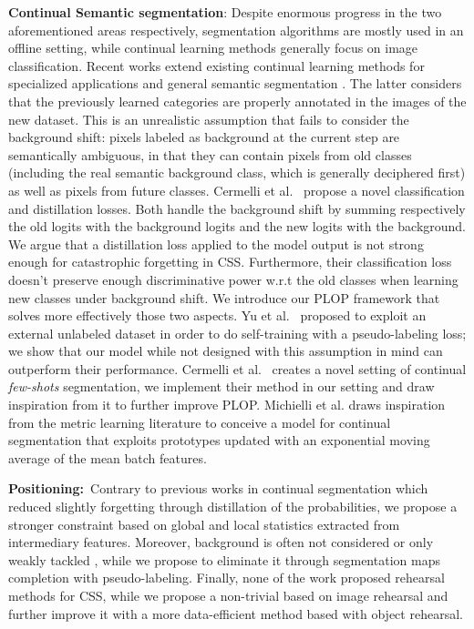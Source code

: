 \noindent\textbf{Continual Semantic segmentation}: Despite enormous progress in the two
aforementioned areas respectively, segmentation algorithms are mostly used in an offline setting,
while continual learning methods generally focus on image classification. Recent works extend
existing continual learning methods \cite{li2018lwf,hou2019ucir} for specialized applications
\cite{ozdemir2018learnthenewkeeptheold,ozdemir2019segmentationanotomical,tasar19incrementsegmentationremotesensing}
and general semantic segmentation \cite{michieli2019ilt}. The latter considers that the previously
learned categories are properly annotated in the images of the new dataset. This is an unrealistic
assumption that fails to consider the background shift: pixels labeled as background at the current
step are semantically ambiguous, in that they can contain pixels from old classes (including the
real semantic background class, which is generally deciphered first) as well as pixels from future
classes. Cermelli et al.~\cite{cermelli2020modelingthebackground} propose a novel classification and
distillation losses. Both handle the background shift by summing respectively the old logits with
the background logits and the new logits with the background. We argue that a distillation loss
applied to the model output is not strong enough for catastrophic forgetting in \ac{CSS}. Furthermore,
their classification loss doesn't preserve enough discriminative power w.r.t the old classes when
learning new classes under background shift. We introduce our PLOP framework that solves more
effectively those two aspects. Yu et al.~\cite{yu2020continualsegmentationselftraining} proposed to
exploit an external unlabeled dataset in order to do self-training with a pseudo-labeling loss; we
show that our model while not designed with this assumption in mind can outperform their
performance. Cermelli et al.~\cite{cermelli2020fewshotcontinualsegm} creates a novel setting of
continual \textit{few-shots} segmentation, we implement their method in our setting and draw
inspiration from it to further improve PLOP. Michielli et al.\cite{michieli2021sdr} draws
inspiration from the metric learning literature to conceive a model for continual segmentation that
exploits prototypes updated with an exponential moving average of the mean batch features.

\noindent\textbf{Positioning:\,} Contrary to previous works in continual segmentation
\cite{michieli2019ilt,cermelli2020modelingthebackground} which reduced slightly forgetting through
distillation of the probabilities, we propose a stronger constraint based on global and local
statistics extracted from intermediary features. Moreover, background is often not considered
\cite{michieli2019ilt} or only weakly tackled \cite{cermelli2020modelingthebackground}, while we
propose to eliminate it through segmentation maps completion with pseudo-labeling. Finally, none of
the work proposed rehearsal methods for \ac{CSS}, while we propose a non-trivial based on image rehearsal
and further improve it with a more data-efficient method based with object rehearsal.

